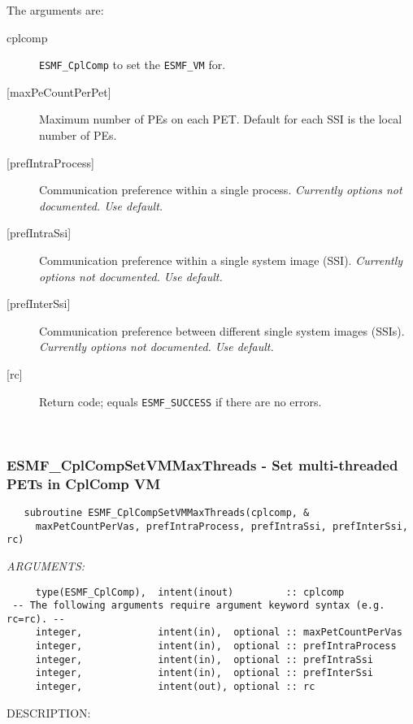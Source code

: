    The arguments are:
   \begin{description}
   \item[cplcomp]
     {\tt ESMF\_CplComp} to set the {\tt ESMF\_VM} for.
   \item[{[maxPeCountPerPet]}]
     Maximum number of PEs on each PET.
     Default for each SSI is the local number of PEs.
   \item[{[prefIntraProcess]}]
     Communication preference within a single process.
     {\em Currently options not documented. Use default.}
   \item[{[prefIntraSsi]}]
     Communication preference within a single system image (SSI).
     {\em Currently options not documented. Use default.}
   \item[{[prefInterSsi]}]
     Communication preference between different single system images (SSIs).
     {\em Currently options not documented. Use default.}
   \item[{[rc]}]
     Return code; equals {\tt ESMF\_SUCCESS} if there are no errors.
   \end{description}
   
 
\mbox{}\hrulefill\ 
 
\subsubsection [ESMF\_CplCompSetVMMaxThreads] {ESMF\_CplCompSetVMMaxThreads - Set multi-threaded PETs in CplComp VM}


  
\begin{verbatim}   subroutine ESMF_CplCompSetVMMaxThreads(cplcomp, &
     maxPetCountPerVas, prefIntraProcess, prefIntraSsi, prefInterSsi, rc)\end{verbatim}{\em ARGUMENTS:}
\begin{verbatim}     type(ESMF_CplComp),  intent(inout)         :: cplcomp
 -- The following arguments require argument keyword syntax (e.g. rc=rc). --
     integer,             intent(in),  optional :: maxPetCountPerVas
     integer,             intent(in),  optional :: prefIntraProcess
     integer,             intent(in),  optional :: prefIntraSsi
     integer,             intent(in),  optional :: prefInterSsi
     integer,             intent(out), optional :: rc\end{verbatim}
{\sf DESCRIPTION:\\ }


